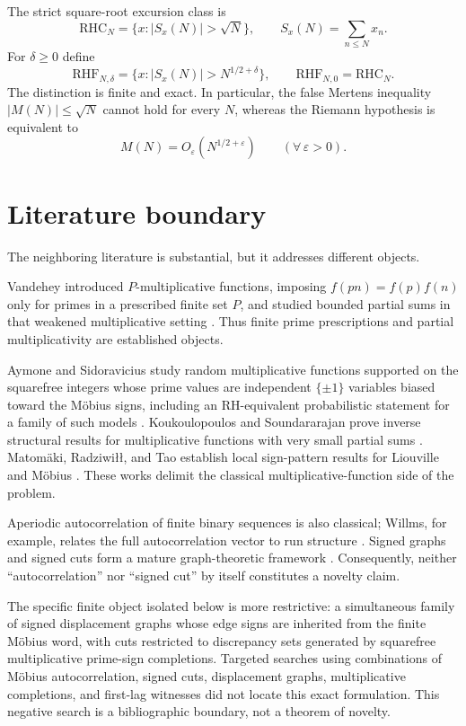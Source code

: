 \documentclass[11pt]{article}
\newcommand{\RHC}{\mathrm{RHC}}
\newcommand{\RHF}{\mathrm{RHF}}
\begin{document}
The strict square-root excursion class is
\[
 \boxed{\RHC_N=\{x:|S_x(N)|>\sqrt N\}},
 \qquad
 S_x(N)=\sum_{n\le N}x_n.
\]
For $\delta\ge0$ define
\[
 \boxed{
 \RHF_{N,\delta}
 =\{x:|S_x(N)|>N^{1/2+\delta}\},
 \qquad
 \RHF_{N,0}=\RHC_N.
 }
\]
The distinction is finite and exact.  In particular, the false Mertens inequality
$|M(N)|\le\sqrt N$ cannot hold for every $N$, whereas the Riemann hypothesis is equivalent to
\[
 M(N)=O_\varepsilon(N^{1/2+\varepsilon})
 \qquad(\forall\,\varepsilon>0).
\]

\section{Literature boundary}

The neighboring literature is substantial, but it addresses different objects.

Vandehey introduced $P$-multiplicative functions, imposing
$f(pn)=f(p)f(n)$ only for primes in a prescribed finite set $P$, and studied bounded partial sums in that weakened multiplicative setting \cite{Vandehey2012}.  Thus finite prime prescriptions and partial multiplicativity are established objects.

Aymone and Sidoravicius study random multiplicative functions supported on the squarefree integers whose prime values are independent $\{\pm1\}$ variables biased toward the M\"obius signs, including an RH-equivalent probabilistic statement for a family of such models \cite{AymoneSidoravicius2017}.  Koukoulopoulos and Soundararajan prove inverse structural results for multiplicative functions with very small partial sums \cite{KoukSound2020}.  Matom\"aki, Radziwi{\l}{\l}, and Tao establish local sign-pattern results for Liouville and M\"obius \cite{MRT2016}.  These works delimit the classical multiplicative-function side of the problem.

Aperiodic autocorrelation of finite binary sequences is also classical; Willms, for example, relates the full autocorrelation vector to run structure \cite{Willms2013}.  Signed graphs and signed cuts form a mature graph-theoretic framework \cite{Zaslavsky1982,Gallier2016}.  Consequently, neither ``autocorrelation'' nor ``signed cut'' by itself constitutes a novelty claim.

The specific finite object isolated below is more restrictive: a simultaneous family of signed displacement graphs whose edge signs are inherited from the finite M\"obius word, with cuts restricted to discrepancy sets generated by squarefree multiplicative prime-sign completions.  Targeted searches using combinations of M\"obius autocorrelation, signed cuts, displacement graphs, multiplicative completions, and first-lag witnesses did not locate this exact formulation.  This negative search is a bibliographic boundary, not a theorem of novelty.
\end{document}
